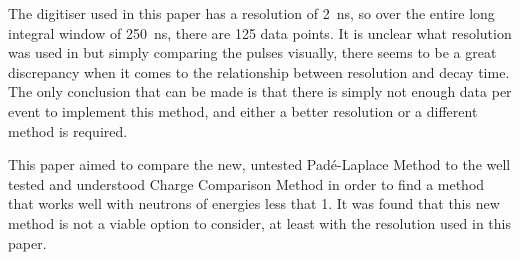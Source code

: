 \documentclass[11pt]{article}
\numberwithin{equation}{section}
\numberwithin{figure}{section}
\numberwithin{table}{section}
\begin{document}
\par The digitiser used in this paper has a resolution of \SI{2}{\nano\second}, so over the entire long integral window of \SI{250}{\nano\second}, there are 125 data points. It is unclear what resolution was used in \cite{Hellen-Pade} but simply comparing the pulses visually, there seems to be a great discrepancy when it comes to the relationship between resolution and decay time. The only conclusion that can be made is that there is simply not enough data per event to implement this method, and either a better resolution or a different method is required. 
\newline
\par This paper aimed to compare the new, untested Pad\'e-Laplace Method to the well tested and understood Charge Comparison Method in order to find a method that works well with neutrons of energies less that \SI{1}{\mevee}. It was found that this new method is not a viable option to consider, at least with the resolution used in this paper. 

\end{document}
